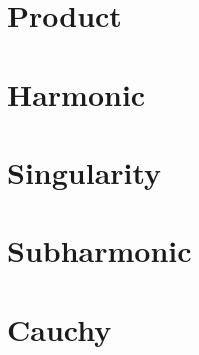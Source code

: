 \documentclass[12pt,letterpaper]{article}
\theoremstyle{plain}
\theoremstyle{definition}
\begin{document}
\section{Product}
\begin{itemize}\setlength\itemsep{4em}\onlyitems[none, include=product]
\mylist
\end{itemize}
\newpage

\section{Harmonic}
\begin{itemize}\setlength\itemsep{4em}\onlyitems[none, include=harmonic]
\mylist
\end{itemize}
\newpage

\section{Singularity}
\begin{itemize}\setlength\itemsep{4em}\onlyitems[none, include=singularity]
\mylist
\end{itemize}
\newpage

\section{Subharmonic}
\begin{itemize}\setlength\itemsep{4em}\onlyitems[none, include=subharmonic]
\mylist
\end{itemize}
\newpage

\section{Cauchy}
\begin{itemize}\setlength\itemsep{4em}\onlyitems[none, include=cauchy]
\mylist
\end{itemize}
\newpage
\end{document}
